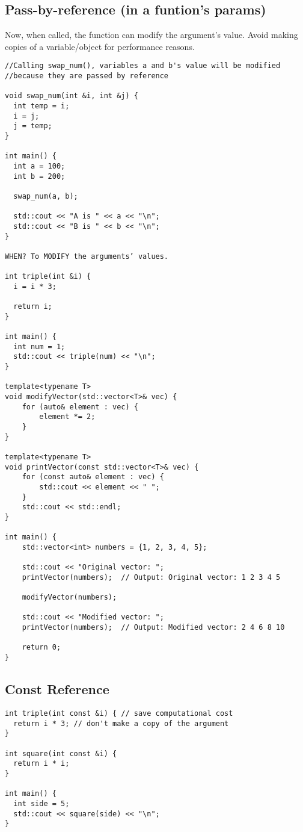 \documentclass[openany]{report}
\begin{document}
\subsection{Pass-by-reference (in a funtion's params)}

Now, when called, the function can modify the argument's value.
Avoid making copies of a variable/object for performance reasons.

\begin{verbatim}
//Calling swap_num(), variables a and b's value will be modified
//because they are passed by reference

void swap_num(int &i, int &j) {
  int temp = i;
  i = j;
  j = temp;
}
 
int main() {
  int a = 100;
  int b = 200;
 
  swap_num(a, b);
 
  std::cout << "A is " << a << "\n";
  std::cout << "B is " << b << "\n";
}

WHEN? To MODIFY the arguments’ values.

int triple(int &i) {
  i = i * 3;
  
  return i;
}

int main() {
  int num = 1;
  std::cout << triple(num) << "\n";
}

template<typename T>
void modifyVector(std::vector<T>& vec) {
    for (auto& element : vec) {
        element *= 2;
    }
}

template<typename T>
void printVector(const std::vector<T>& vec) {
    for (const auto& element : vec) {
        std::cout << element << " ";
    }
    std::cout << std::endl;
}

int main() {
    std::vector<int> numbers = {1, 2, 3, 4, 5};

    std::cout << "Original vector: ";
    printVector(numbers);  // Output: Original vector: 1 2 3 4 5

    modifyVector(numbers);

    std::cout << "Modified vector: ";
    printVector(numbers);  // Output: Modified vector: 2 4 6 8 10

    return 0;
}
\end{verbatim}

\subsection{Const Reference}

\begin{verbatim}
int triple(int const &i) { // save computational cost
  return i * 3; // don't make a copy of the argument
}

int square(int const &i) {
  return i * i;
}

int main() {
  int side = 5;
  std::cout << square(side) << "\n";
}
\end{verbatim}
\end{document}
